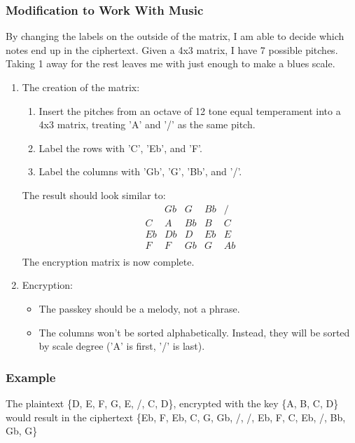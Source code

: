 \documentclass[14pt]{article}
\begin{document}
    	\subsubsection{Modification to Work With Music}
    	By changing the labels on the outside of the matrix, I am able to decide which notes end up in the ciphertext. Given a 4x3 matrix, I have 7 possible pitches. Taking 1 away for the rest leaves me with just enough to make a blues scale.
    	\begin{enumerate}
    		\item The creation of the matrix:
    			\begin{enumerate}
    				\item Insert the pitches from an octave of 12 tone equal temperament into a 4x3 matrix, treating 'A' and '/' as the same pitch.
    
    				\item Label the rows with 'C', 'Eb', and 'F'.
    
    				\item Label the columns with 'Gb', 'G', 'Bb', and '/'.
    			\end{enumerate}
    			The result should look similar to:
    			\[
    				\begin{array}{c|cccc}
    					   & Gb & G  & Bb & /  \\
    					\hline
    					C  & A  & Bb & B  & C  \\
    					Eb & Db & D  & Eb & E  \\
    					F  & F  & Gb & G  & Ab \\
    				\end{array}
    			\]
    			The encryption matrix is now complete.
    
    		\item Encryption:
    			\begin{itemize}
    				\item The passkey should be a melody, not a phrase.
    
    				\item The columns won't be sorted alphabetically. Instead, they will be sorted by scale degree ('A' is first, '/' is last).
    			\end{itemize}
    	\end{enumerate}
    
    	\subsubsection{Example}
    	The plaintext \{D, E, F, G, E, /, C, D\}, encrypted with the key \{A, B, C, D\} would result in the ciphertext \{Eb, F, Eb, C, G, Gb, /, /, Eb, F, C, Eb, /,
    	Bb, Gb, G\}
\end{document}
